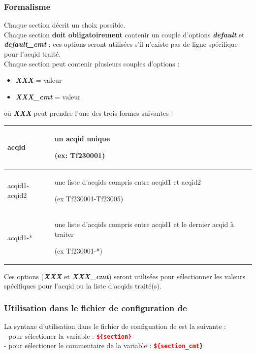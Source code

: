 \subsubsection{Formalisme}

Chaque section décrit un choix possible.  \\

Chaque section \textbf{doit obligatoirement} contenir un couple d'options
\textbf{\textit{default}} et \textbf{\textit{default\_cmt}} : ces
options seront utilisées s'il n'existe pas de ligne spécifique pour
l'acqid traité. \\

Chaque section peut contenir plusieurs couples d'options :
\begin{itemize}
  \item \textbf{\textit{XXX}} = valeur
  \item \textbf{\textit{XXX\_cmt}} = valeur
\end{itemize}
\medbreak

où \textbf{\textit{XXX}} peut prendre l'une des trois formes suivantes :

\begin{tabular}{|l|p{8cm}|}
\hline
 acqid & un acqid unique
 
 (ex: Tf230001) \\
\hline
 acqid1-acqid2 & une liste d'acqids compris entre acqid1 et acqid2
 
 (ex Tf230001-Tf23005) \\
\hline
 acqid1-* & une liste d'acqids compris entre acqid1 et le dernier acqid à
 traiter
 
 (ex Tf230001-*) \\
\hline
\end{tabular}
\medbreak

Ces options (\textbf{\textit{XXX}} et \textbf{\textit{XXX\_cmt}}) seront
utilisées pour sélectionner les valeurs spécifiques pour
l'acqid ou la liste d'acqids traité(s).
\medbreak

\subsubsection{Utilisation dans le fichier de configuration de \prodcdf}

La syntaxe d'utilisation dans le fichier de configuation de
\prodcdf est la suivante : \\
- pour sélectioner la variable :
  \texttt{\textbf{\textcolor{red}{\$\{section\}}}} \\
- pour sélectioner le commentaire de la variable :
  \texttt{\textbf{\textcolor{red}{\$\{section\_cmt}\}}}
\medbreak

